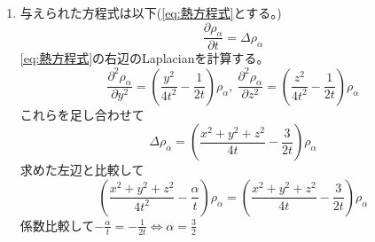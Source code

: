 \begin{souanswer}
\begin{enumerate}
	\item 与えられた方程式は以下(\eqref{eq:熱方程式}とする。)
\begin{equation} \tag{H}\label{eq:熱方程式}
	\frac{\partial \rho_\alpha}{\partial t}= \Delta\rho_\alpha
\end{equation}
	\eqref{eq:熱方程式}の右辺のLaplacianを計算する。
\begin{equation*}
	\frac{\partial^2 \rho_\alpha}{\partial y^2}= \left(\frac{y^2}{4t^2}- \frac{1}{2t}\right)\rho_\alpha,\ 
	\frac{\partial^2 \rho_\alpha}{\partial z^2}= \left(\frac{z^2}{4t^2}- \frac{1}{2t}\right)\rho_\alpha
\end{equation*}
	これらを足し合わせて
\begin{equation*}
	\Delta\rho_\alpha= \left(\frac{x^2+ y^2+ z^2}{4t}- \frac{3}{2t}\right)\rho_\alpha
\end{equation*}
	求めた左辺と比較して
\begin{equation*}
	\left(\frac{x^2+ y^2+ z^2}{4t^2}- \frac{\alpha}{t}\right)\rho_\alpha= \left(\frac{x^2+ y^2+ z^2}{4t}- \frac{3}{2t}\right)\rho_\alpha
\end{equation*}
	係数比較して$-\frac{\alpha}{t}= -\frac{1}{2t}\iff \alpha= \frac{3}{2}$

\end{enumerate}
\end{souanswer}